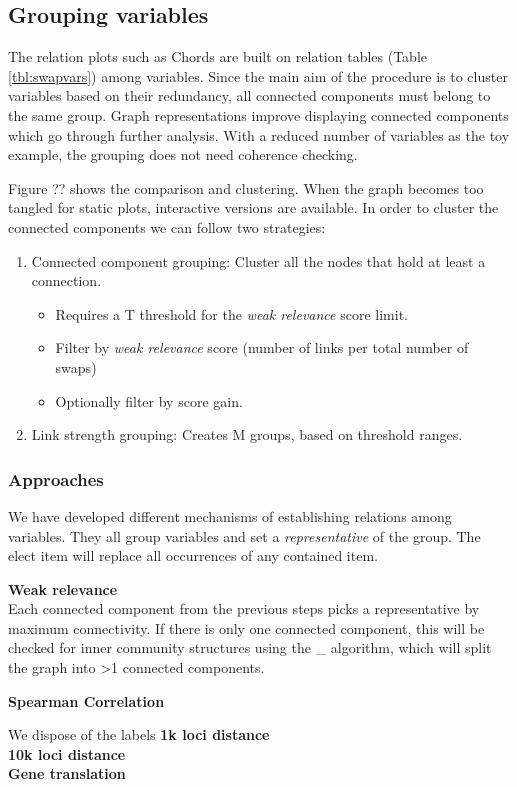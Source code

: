 \subsection{Grouping variables}

The relation plots such as Chords are built on relation tables (Table \ref{tbl:swapvars}) among variables. Since the main aim of the procedure is to cluster variables based on their redundancy, all connected components must belong to the same group.
Graph representations improve displaying connected components which go through further analysis. With a reduced number of variables as the toy example, the grouping does not need coherence checking.

Figure ?? shows the comparison and clustering. When the graph becomes too tangled for static plots, interactive versions are available.
In order to cluster the connected components we can follow two strategies:

\begin{enumerate}
    \item Connected component grouping: Cluster all the nodes that hold at least a connection.
    \begin{itemize}
        \item Requires a T threshold for the \emph{weak relevance} score limit.
        \item Filter by \emph{weak relevance} score (number of links per total number of swaps)
        \item Optionally filter by score gain.
    \end{itemize}
    
    \item Link strength grouping: Creates M groups, based on threshold ranges.
\end{enumerate}


\subsubsection{Approaches}
We have developed different mechanisms of establishing relations among variables. They all group variables and set a \textit{representative} of the group. The elect item will replace all occurrences of any contained item.

\textbf{Weak relevance}\\
Each connected component from the previous steps picks a representative by maximum connectivity. If there is only one connected component, this will be checked for inner community structures using the \_ algorithm, which will split the graph into >1 connected components.

\textbf{Spearman Correlation}

We dispose of the labels
\textbf{1k loci distance}\\

\textbf{10k loci distance}\\

\textbf{Gene translation}
